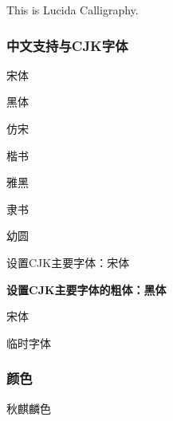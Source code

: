 \documentclass{ctexart}
\begin{document}
            {\lucida This is Lucida Calligraphy.}


        \subsubsection{中文支持与CJK字体}
            {\songti 宋体}

            {\heiti 黑体}

            {\fangsong 仿宋}

            {\kaishu 楷书}

            {\yahei 雅黑}

            {\lishu 隶书}

            {\youyuan 幼圆}
            
            设置CJK主要字体：宋体

            \textbf{设置CJK主要字体的粗体：黑体}
        

            {\songtii 宋体}

            { 临时字体}

        \subsubsection{颜色}\label{subsubsec:3.4.6}
            {\color{goldenrod}秋麒麟色}
\end{document}
